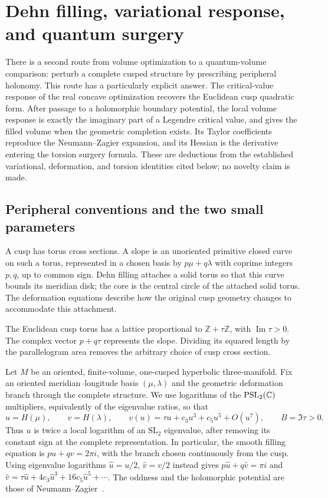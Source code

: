 \section{Dehn filling, variational response, and quantum surgery}
\label{sec:dehnresponse}

There is a second route from volume optimization to a quantum-volume
comparison: perturb a complete cusped structure by prescribing peripheral
holonomy. This route has a particularly explicit answer. The critical-value
response of the real concave optimization recovers the Euclidean cusp
quadratic form. After passage to a holomorphic boundary potential, the
local volume response is exactly the imaginary part of a Legendre
critical value, and gives the filled volume when the geometric completion exists.
Its Taylor coefficients reproduce the Neumann--Zagier expansion, and its
Hessian is the derivative entering the torsion surgery formula.
These are deductions from the established variational, deformation, and
torsion identities cited below; no novelty claim is made.

\subsection{Peripheral conventions and the two small parameters}

A cusp has torus cross sections. A slope is an unoriented primitive
closed curve on such a torus, represented in a chosen basis by
$p\mu+q\lambda$ with coprime integers $p,q$, up to common sign.
Dehn filling attaches a solid torus so that this curve bounds its
meridian disk; the core is the central circle of the attached solid
torus. The deformation equations describe how the original cusp
geometry changes to accommodate this attachment.

The Euclidean cusp torus has a lattice proportional to
$\mathbb Z+\tau\mathbb Z$, with $\operatorname{Im}\tau>0$.
The complex vector $p+q\tau$ represents the slope. Dividing its
squared length by the parallelogram area removes the arbitrary
choice of cusp cross section.

Let $M$ be an oriented, finite-volume, one-cusped hyperbolic
three-manifold. Fix an oriented meridian--longitude basis $(\mu,\lambda)$
and the geometric deformation branch through the complete structure.
We use logarithms of the $\mathrm{PSL}_2(\mathbb C)$ multipliers, equivalently
of the eigenvalue ratios, so that
\begin{equation}
 u=H(\mu),\qquad v=H(\lambda),\qquad
 v(u)=\tau u+c_3u^3+c_5u^5+O(u^7),\qquad
 B=\Im\tau>0.
 \label{eq:dehnholonomy}
\end{equation}
Thus $u$ is twice a local logarithm of an $\mathrm{SL}_2$ eigenvalue,
after removing its constant sign at the complete representation.
In particular, the smooth filling equation is $pu+qv=2\pi i$,
with the branch chosen continuously from the cusp. Using eigenvalue
logarithms $\widehat u=u/2$, $\widehat v=v/2$ instead gives
$p\widehat u+q\widehat v=\pi i$ and
$\widehat v=\tau\widehat u+4c_3\widehat u^3+16c_5\widehat u^5+\cdots$.
The oddness and the holomorphic potential are those of
Neumann--Zagier~\cite[Sections 4--6]{NeumannZagier}.

